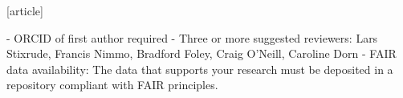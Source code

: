 [article]

- ORCID of first author required
- Three or more suggested reviewers: Lars Stixrude, Francis Nimmo, Bradford Foley, Craig O'Neill, Caroline Dorn
- FAIR data availability: The data that supports your research must be deposited in a repository compliant with FAIR principles.

